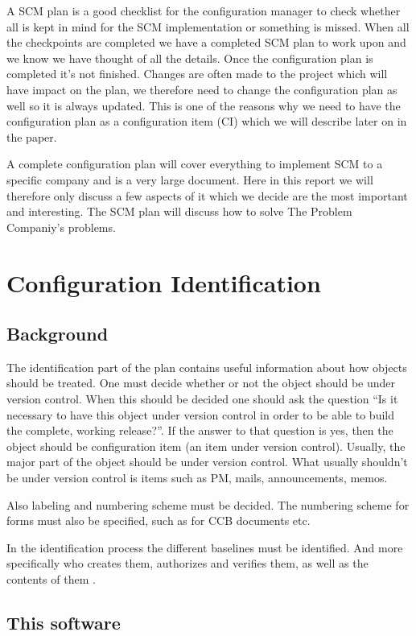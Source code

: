 \documentclass[a4paper,11pt]{article}
\begin{document}
A SCM plan is a good checklist for the configuration manager to check whether 
all is kept in mind for the SCM implementation or something is missed. When all
the checkpoints are completed we have a completed SCM plan to work upon and we
know we have thought of all the details. Once the configuration plan is
completed it’s not finished. Changes are often made to the project which will
have impact on the plan, we therefore need to change the configuration plan as
well so it is always updated. This is one of the reasons why we need to have the
configuration plan as a configuration item (CI) which we will describe later on
in the paper.

A complete configuration plan will cover everything to implement SCM to a 
specific company and is a very large document. Here in this report we will
therefore only discuss a few aspects of it which we decide are the most
important and interesting. The SCM plan will discuss how to solve The Problem
Companiy's problems.

\section{Configuration Identification}

\subsection{Background}
The identification part of the plan contains useful information about how
objects should be treated. One must decide whether or not the object should be
under version control. When this should be decided one should ask the question
``Is it necessary to have this object under version control in order to be able
to build the complete, working release?''. If the answer to that question is
yes, then the object should be configuration item (an item under version
control). Usually, the major part of the object should be under version control.
What usually shouldn't be under version control is items such as PM, mails,
announcements, memos.

Also labeling and numbering scheme must be decided.
The numbering scheme for forms must also be specified, such as for CCB
documents etc.

In the identification process the different baselines must be identified. And
more specifically who creates them, authorizes and verifies them, as well as the
contents of them \cite{cagan}.

\subsection{This software}
\end{document}

